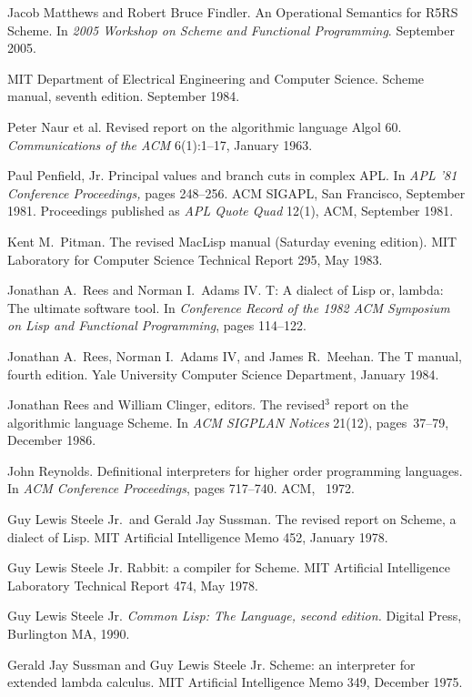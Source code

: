 \begin{thebibliography}{999}
Jacob Matthews and Robert Bruce Findler.
An Operational Semantics for R5RS Scheme.
In {\em 2005 Workshop on Scheme and Functional Programming}.
September 2005.

MIT Department of Electrical Engineering and Computer Science.
Scheme manual, seventh edition.
September 1984.

Peter Naur et al.
Revised report on the algorithmic language Algol 60.
{\em Communications of the ACM} 6(1):1--17, January 1963.

Paul Penfield, Jr.
Principal values and branch cuts in complex APL.
In {\em APL '81 Conference Proceedings,} pages 248--256.
ACM SIGAPL, San Francisco, September 1981.
Proceedings published as {\em APL Quote Quad} 12(1), ACM, September 1981.

Kent M.~Pitman.
The revised MacLisp manual (Saturday evening edition).
MIT Laboratory for Computer Science Technical Report 295, May 1983.

Jonathan A.~Rees and Norman I.~Adams IV.
T: A dialect of Lisp or, lambda: The ultimate software tool.
In {\em Conference Record of the 1982 ACM Symposium on Lisp and
  Functional Programming}, pages 114--122.

Jonathan A.~Rees, Norman I.~Adams IV, and James R.~Meehan.
The T manual, fourth edition.
Yale University Computer Science Department, January 1984.

Jonathan Rees and William Clinger, editors.
The revised$^3$ report on the algorithmic language Scheme.
In {\em ACM SIGPLAN Notices} 21(12), pages~37--79, December 1986.

John Reynolds.
Definitional interpreters for higher order programming languages.
In {\em ACM Conference Proceedings}, pages 717--740.
ACM, ~1972.

Guy Lewis Steele Jr.~and Gerald Jay Sussman.
The revised report on Scheme, a dialect of Lisp.
MIT Artificial Intelligence Memo 452, January 1978.

Guy Lewis Steele Jr.
Rabbit: a compiler for Scheme.
MIT Artificial Intelligence Laboratory Technical Report 474, May 1978.

Guy Lewis Steele Jr.
{\em Common Lisp: The Language, second edition.}
Digital Press, Burlington MA, 1990.

Gerald Jay Sussman and Guy Lewis Steele Jr.
Scheme: an interpreter for extended lambda calculus.
MIT Artificial Intelligence Memo 349, December 1975.


\end{thebibliography}
